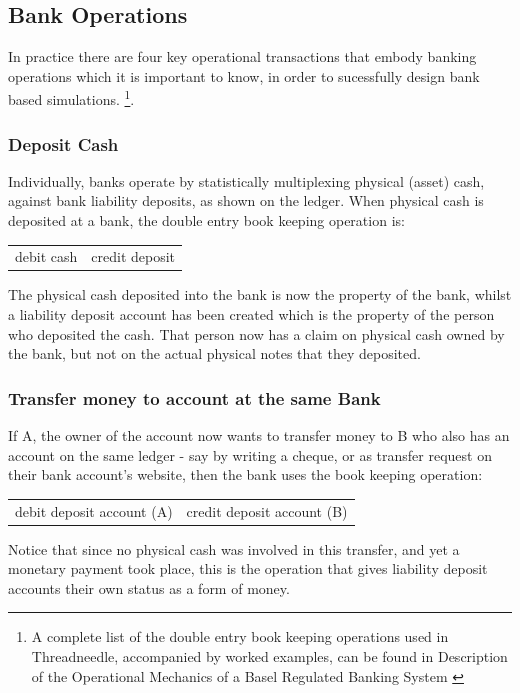 \documentclass[10pt,oneside,openright, a4paper]{memoir}
\begin{document}
\subsection{Bank Operations}
In practice there are four key operational transactions that
embody banking operations which it is important to know,
in order to sucessfully design bank based simulations.
\footnote{A complete list of the double entry book keeping 
operations used in Threadneedle, accompanied by worked examples, can be 
found in Description of the Operational Mechanics of a Basel 
Regulated Banking System \cite{mallett.2012.2}}. 
\par
\subsubsection{Deposit Cash}
Individually, banks operate by statistically multiplexing 
physical (asset) cash, against bank liability deposits, as
shown on the ledger. When physical cash is deposited at
a bank, the double entry book keeping operation is:
\begin{table}[ht]
\centering
\begin{tabular}{ll}
debit cash & credit deposit\\
\end{tabular}
\end{table}
The physical cash deposited into the bank is now the property
of the bank, whilst a liability deposit account has been
created which is the property of the person who deposited
the cash. That person now has a claim on physical cash owned
by the bank, but not on the actual physical notes that
they deposited.
\par
\subsubsection{Transfer money to account at the same Bank}
If A, the owner of the account now wants to transfer money
to B who also has an account on the same 
ledger - say by writing a cheque, or as transfer request on
their bank account's website,  then the bank uses the book keeping operation:
\begin{table}[ht]
\centering
\begin{tabular}{ll}
debit deposit account (A) & credit deposit account (B)\\
\end{tabular}
\end{table}
Notice that since no physical cash was involved in this
transfer, and yet a monetary payment took place, this is the operation 
that gives liability deposit accounts their own status as a form of
money.
\end{document}
